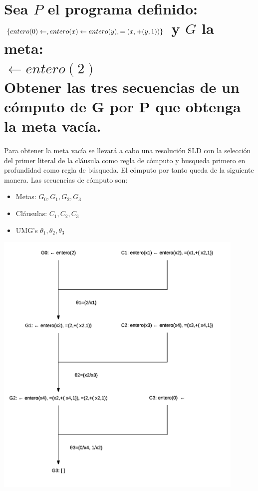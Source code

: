\documentclass[11pt, a4paper,spanish]{article}
\begin{document}
	\clearpage
	\section{Sea $P$ el programa definido: \\
		$\{entero(0) \gets ,\\
		entero(x) \gets entero(y), =(x, +(y,1))\}\\$
		y $G$ la meta: \\
		$\gets entero(2)$\\
		Obtener las tres secuencias de un cómputo de G por P que obtenga la meta vacía.}

		\paragraph{}
		Para obtener la meta vacía se llevará a cabo una resolución SLD con la selección del primer literal de la cláusula como regla de cómputo y busqueda primero en profundidad como regla de búsqueda. El cómputo por tanto queda de la siguiente manera. Las secuencias de cómputo son:
		\begin{itemize}
			\item Metas: $G_0, G_1, G_2,G_3$
			\item Cláusulas: $C_1, C_2,C_3$
			\item UMG's $\theta_1, \theta_2, \theta_3$
		\end{itemize}
		\includegraphics[width=0.9\textwidth]{sld-computation}
\end{document}

